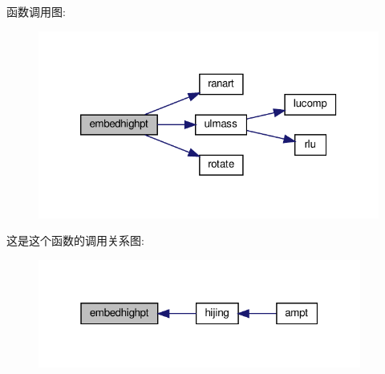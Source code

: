 函数调用图\+:
\nopagebreak
\begin{figure}[H]
\begin{center}
\leavevmode
\includegraphics[width=320pt]{embedhighpt_8f90_a22af742159568425bbfc1a79bae99eb4_cgraph}
\end{center}
\end{figure}
这是这个函数的调用关系图\+:
\nopagebreak
\begin{figure}[H]
\begin{center}
\leavevmode
\includegraphics[width=301pt]{embedhighpt_8f90_a22af742159568425bbfc1a79bae99eb4_icgraph}
\end{center}
\end{figure}
